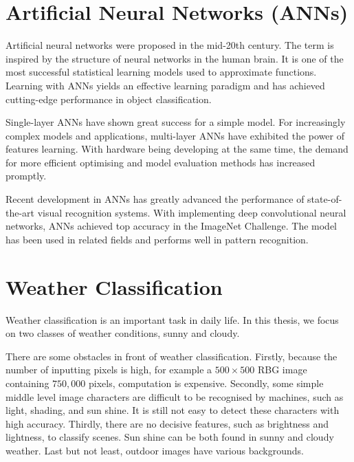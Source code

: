 \section{Artificial Neural Networks (ANNs)}

Artificial neural networks were proposed in the mid-20th century. The term is inspired by the structure of neural networks in the human brain. It is one of the most successful statistical learning models used to approximate functions. Learning with ANNs yields an effective learning paradigm and has achieved cutting-edge performance in object classification. 

Single-layer ANNs  have shown great success for a simple model. For increasingly complex models and applications, multi-layer ANNs have exhibited the power of features learning. With hardware being developing at the same time, the demand for more efficient optimising and model evaluation methods has increased promptly. 

Recent development in ANNs has greatly advanced the performance of state-of-the-art visual recognition systems. With implementing deep convolutional neural networks, ANNs achieved top accuracy in the ImageNet Challenge. The model has been used in related fields and performs well in pattern recognition.

\section{Weather Classification}

Weather classification is an important task in daily life. In this thesis, we focus on two classes of weather conditions, sunny and cloudy. 

There are some obstacles in front of weather classification. Firstly, because the number of inputting pixels is high, for example a $500 \times 500$ RBG image containing $750,000$ pixels, computation is expensive. Secondly, some simple middle level image characters are difficult to be recognised by machines, such as light, shading, and sun shine. It is still not easy to detect these characters with high accuracy. Thirdly, there are no decisive features, such as brightness and lightness, to classify scenes. Sun shine can be both found in sunny and cloudy weather. Last but not least, outdoor images have various backgrounds.


